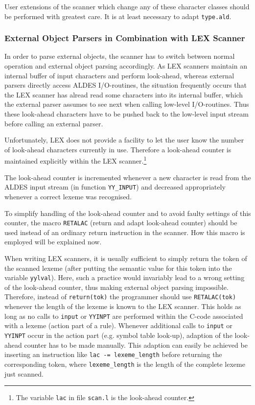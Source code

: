 User extensions of the scanner which change any of these character classes
should be performed with greatest care. It is at least necessary to adapt
{\tt type.ald}.


\subsubsection{External Object Parsers in Combination with LEX Scanner}
\label{extparse}
In order to parse external objects, the scanner has to switch between
normal operation and external object parsing accordingly.
As LEX scanners maintain an internal buffer of input characters and
perform look-ahead, whereas external parsers directly access ALDES I/O-routines,
the situation frequently occurs that the LEX scanner has alread read some
characters into its internal buffer, which the external parser
assumes to see next when calling low-level I/O-routines.
Thus these look-ahead characters have to be pushed back to the low-level
input stream before calling an external parser.

Unfortunately, LEX does not provide a facility to let the user know the number of
look-ahead characters currently in use. Therefore a look-ahead counter
is maintained explicitly within the LEX scanner.\footnote{The variable {\tt lac} in
file {\tt scan.l} is the look-ahead counter.}

The look-ahead counter is incremented whenever a new character is read from
the ALDES input stream (in function {\tt YY\_INPUT})
and decreased appropriately whenever a correct lexeme was recognised.

To simplify handling of the look-ahead counter and to avoid faulty
settings of this counter, the macro {\tt RETALAC}
(return and adapt look-ahead counter) should be used instead of an ordinary
return instruction in the scanner. How this macro is employed will be explained
now.

When writing LEX scanners, it is usually sufficient to simply return
the token of the scanned lexeme (after putting the semantic value for this
token into the variable {\tt yylval}).
Here, such a practice would invariably lead to a wrong setting of the
look-ahead counter, thus making external object parsing impossible.
Therefore, instead of {\tt return(tok)} the programmer should use
{\tt RETALAC(tok)} whenever the length of the lexeme is known to the
LEX scanner. This holds as long as no calls to {\tt input} or {\tt YYINPT}
are performed within the C-code associated with a lexeme (action part of a
rule).
Whenever additional calls to {\tt input} or {\tt YYINPT} occur in the
action part (e.g. symbol table look-up), adaption of the look-ahead counter
has to be made manually. This adaption can easily be achieved be inserting
an instruction like {\tt lac -= lexeme\_length} before returning the
corresponding token, where {\tt lexeme\_length} is the length of the complete
lexeme just scanned.

